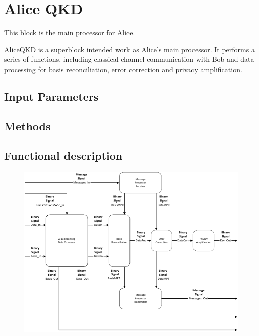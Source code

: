 \clearpage

\section{Alice QKD}

\maketitle
This block is the main processor for Alice. 

AliceQKD is a superblock intended work as Alice's main processor. It performs a 
series of functions, including classical channel communication with Bob and 
data processing for basis reconciliation, error correction and privacy 
amplification.

\subsection*{Input Parameters}



\subsection*{Methods}
%
%
%
%
%

\subsection*{Functional description}

\begin{figure}[H]
	\centering
	\includegraphics{./lib/alice_qkd2/figures/AliceQKD_blockDiagram.pdf}
\end{figure}

